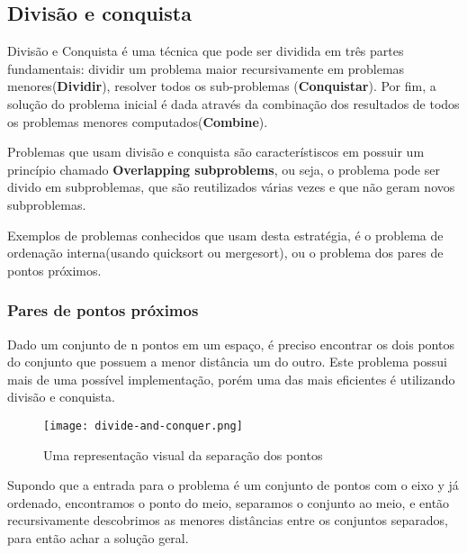 \subsection{Divisão e conquista}

    Divisão e Conquista é uma técnica que pode ser dividida em três 
    partes fundamentais: dividir um problema maior recursivamente em 
    problemas menores(\textbf{Dividir}), resolver todos os 
    sub-problemas (\textbf{Conquistar}). Por fim, a solução do problema inicial 
    é dada através da combinação dos resultados de todos os problemas 
    menores computados(\textbf{Combine}). 

    Problemas que usam divisão e conquista são característiscos em possuir um princípio 
    chamado \textbf{Overlapping subproblems}, ou seja, o problema pode ser divido em 
    subproblemas, que são reutilizados várias vezes e que não geram novos subproblemas.
    
    Exemplos de problemas conhecidos que usam desta estratégia, é o problema de 
    ordenação interna(usando quicksort ou mergesort), ou o problema dos pares de pontos próximos.

\subsubsection{Pares de pontos próximos}

    Dado um conjunto de n pontos em um espaço, é preciso encontrar os dois pontos do conjunto que possuem a 
    menor distância um do outro. Este problema possui mais de uma possível implementação, porém 
    uma das mais eficientes é utilizando divisão e conquista.

    \begin{figure}[ht]
        \centering
        \texttt{[image: divide-and-conquer.png]}
        \caption{Uma representação visual da separação dos pontos}
        \label{fig:divide-and-conquer}
    \end{figure}

    Supondo que a entrada para o problema é um conjunto de pontos com o eixo y já ordenado,
    encontramos o ponto do meio, separamos o conjunto ao meio, e então recursivamente descobrimos
    as menores distâncias entre os conjuntos separados, para então achar a solução geral.

    \newpage 

